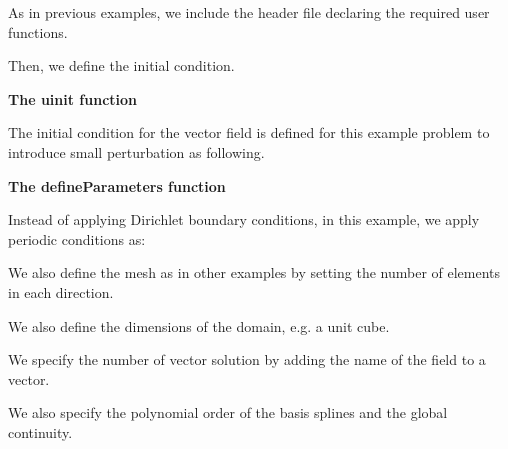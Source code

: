  As in previous examples, we include the header file declaring the required user functions.


\begin{DoxyCodeInclude}

\end{DoxyCodeInclude}


Then, we define the initial condition.

{\bfseries  The {\ttfamily uinit} function }

The initial condition for the vector field is defined for this example problem to introduce small perturbation as following.


\begin{DoxyCodeInclude}

\end{DoxyCodeInclude}


{\bfseries  The {\ttfamily define\-Parameters} function }

Instead of applying Dirichlet boundary conditions, in this example, we apply periodic conditions as\-:


\begin{DoxyCodeInclude}

\end{DoxyCodeInclude}


We also define the mesh as in other examples by setting the number of elements in each direction.


\begin{DoxyCodeInclude}

\end{DoxyCodeInclude}


We also define the dimensions of the domain, e.\-g. a unit cube.


\begin{DoxyCodeInclude}

\end{DoxyCodeInclude}


We specify the number of vector solution by adding the name of the field to a vector.


\begin{DoxyCodeInclude}

\end{DoxyCodeInclude}


We also specify the polynomial order of the basis splines and the global continuity.


\begin{DoxyCodeInclude}

\end{DoxyCodeInclude}


